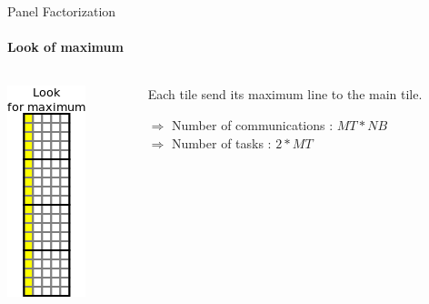 \documentclass{beamer}
\begin{document}
\begin{frame}{Panel Factorization}
\framesubtitle{Look of maximum}
\begin{columns}
\begin{column}{.30\textwidth}
\begin{center}
\includegraphics[scale=0.8]{panel_max.png}
\end{center}
\end{column}
\hfill
\begin{column}{.70\textwidth}
Each tile send its maximum line to the main tile.
\begin{center}
\begin{exampleblock}{}
$\Longrightarrow$ Number of communications : $MT*NB$\\
$\Longrightarrow$ Number of tasks : $2*MT$
\end{exampleblock}{}
\end{center}
\end{column}
\end{columns}
\end{frame}
\end{document}
